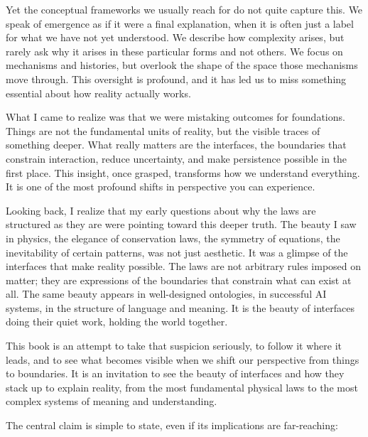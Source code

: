 \documentclass[
  openright]{book}
\begin{document}
Yet the conceptual frameworks we usually reach for do not quite capture
this. We speak of emergence as if it were a final explanation, when it
is often just a label for what we have not yet understood. We describe
how complexity arises, but rarely ask why it arises in these particular
forms and not others. We focus on mechanisms and histories, but overlook
the shape of the space those mechanisms move through. This oversight is
profound, and it has led us to miss something essential about how
reality actually works.

What I came to realize was that we were mistaking outcomes for
foundations. Things are not the fundamental units of reality, but the
visible traces of something deeper. What really matters are the
interfaces, the boundaries that
constrain interaction, reduce uncertainty, and make
persistence possible in the first place. This
insight, once grasped, transforms how we understand everything. It is
one of the most profound shifts in perspective you can experience.

Looking back, I realize that my early questions about why the laws are
structured as they are were pointing toward this deeper truth. The
beauty I saw in physics, the elegance of conservation laws, the symmetry
of equations, the inevitability of certain patterns, was not just
aesthetic. It was a glimpse of the interfaces that make reality
possible. The laws are not arbitrary rules imposed on matter; they are
expressions of the boundaries that constrain what can exist at all. The
same beauty appears in well-designed ontologies, in successful AI
systems, in the structure of language and meaning. It is the beauty of
interfaces doing their quiet work, holding the world together.

This book is an attempt to take that suspicion seriously, to follow it
where it leads, and to see what becomes visible when we shift our
perspective from things to boundaries. It is an invitation to see the
beauty of interfaces and how they stack up to explain reality, from the
most fundamental physical laws to the most complex systems of meaning
and understanding.

The central claim is simple to state, even if its implications are
far-reaching:

\begin{center}
\end{center}
\end{document}
